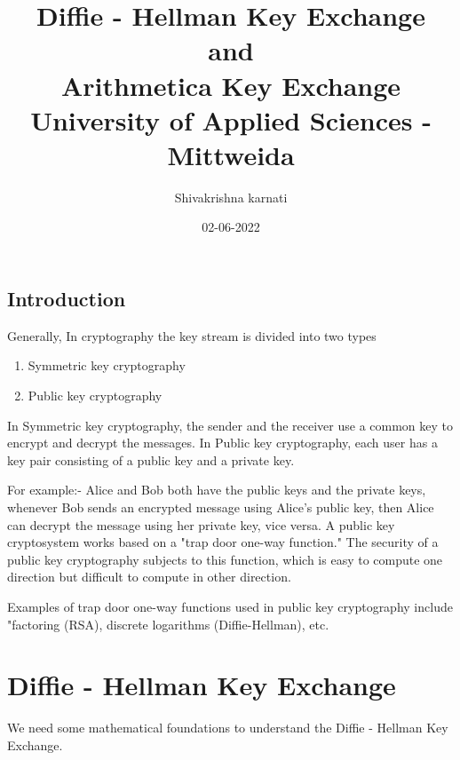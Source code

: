 \documentclass[12pt]{article}
\begin{document}
\title{Diffie - Hellman Key Exchange\\
 and\\
 Arithmetica Key Exchange\\
{\Large University of Applied Sciences - Mittweida}}
\author{Shivakrishna karnati}
\date{02-06-2022}
\maketitle
\pagebreak
 \tableofcontents
 \pagebreak
  \section{Introduction}
       Generally, In cryptography the key stream is divided into two types
        \begin{enumerate}
        \item Symmetric key cryptography
        \item Public key cryptography
        \end{enumerate}

         In Symmetric key cryptography, the sender and the receiver use a common key to encrypt and decrypt the messages. 
    In Public key cryptography, each user has a key pair consisting of a public key and a private key.
   
         
          For example:- Alice and Bob both have the public keys and the private keys, whenever Bob sends an encrypted message using Alice's public key, then Alice can decrypt the message using her private key, vice versa.
        A public key cryptosystem works based on a "trap door one-way function." The security of a public key cryptography subjects to this function, which is easy to compute one direction but difficult to compute in other direction.


   
      Examples of trap door one-way functions used in public key cryptography include "factoring (RSA), discrete logarithms (Diffie-Hellman), etc\cite{stamp2007applied}.

  \chapter{Diffie - Hellman Key Exchange}
        We need some mathematical foundations to understand the Diffie - Hellman Key Exchange.
\end{document}
